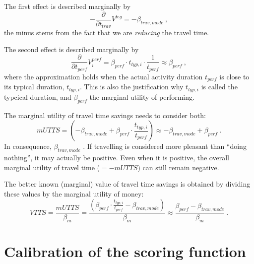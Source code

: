 The first effect is described marginally by
\[
- \frac{\partial}{\partial t_{trav}} V^{leg} = - \beta_{trav,mode} \ ,
\]
the minus stems from the fact that we are \emph{reducing} the travel time.

The second effect is described marginally by
\[
\frac{\partial}{\partial t_{perf}} V^{perf}_i
%
= \beta_{perf} \cdot t_{typ,i} \cdot \frac{1}{t_{perf}}
%
\approx \beta_{perf} \ ,
\]
where the approximation holds when the actual activity duration $t_{perf}$ is close to its typical duration, $t_{typ,i}$.  This is also the justification why $t_{typ,i}$ is called the typcical duration, and $\beta_{perf}$ the marginal utility of performing.

The marginal utility of travel time savings needs to consider both:
\[
mUTTS 
%
= \left( - \beta_{trav,mode} + \beta_{perf} \cdot \frac{t_{typ,i}}{t_{perf}} \right)
%
\approx - \beta_{trav,mode} + \beta_{perf} \ .
\]
In consequence, $\beta_{trav,mode}$ .  If travelling is considered more pleasant than ``doing nothing'', it may actually be positive.  Even when it is positive, the overall marginal utility of travel time ($= -mUTTS$) can still remain negative.

The better known (marginal) value of travel time savings is obtained by dividing these values by the marginal utility of money:
\[
VTTS = \frac{mUTTS}{\beta_m} 
%
= \frac{\left( \beta_{perf} \cdot \frac{t_{typ,i}}{t_{perf}} - \beta_{trav,mode} \right)}{\beta_m}
%
\approx \frac{\beta_{perf} - \beta_{trav,mode}}{\beta_m} \ .
\]



\section{Calibration of the scoring function}


